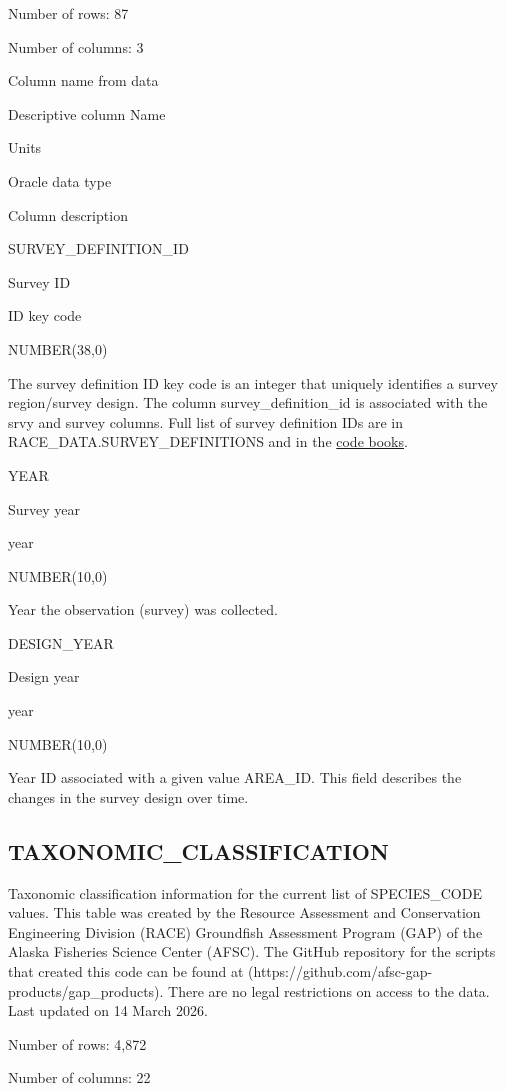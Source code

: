 \documentclass[
  letterpaper,
  oneside,
  open=any]{scrbook}
\begin{document}
Number of rows: 87

Number of columns: 3

Column name from data

Descriptive column Name

Units

Oracle data type

Column description

SURVEY\_DEFINITION\_ID

Survey ID

ID key code

NUMBER(38,0)

The survey definition ID key code is an integer that uniquely identifies
a survey region/survey design. The column survey\_definition\_id is
associated with the srvy and survey columns. Full list of survey
definition IDs are in RACE\_DATA.SURVEY\_DEFINITIONS and in the
\href{https://www.fisheries.noaa.gov/resource/document/groundfish-survey-species-code-manual-and-data-codes-manual}{code
books}.

YEAR

Survey year

year

NUMBER(10,0)

Year the observation (survey) was collected.

DESIGN\_YEAR

Design year

year

NUMBER(10,0)

Year ID associated with a given value AREA\_ID. This field describes the
changes in the survey design over time.

\subsection{TAXONOMIC\_CLASSIFICATION}\label{taxonomic_classification}

Taxonomic classification information for the current list of
SPECIES\_CODE values. This table was created by the Resource Assessment
and Conservation Engineering Division (RACE) Groundfish Assessment
Program (GAP) of the Alaska Fisheries Science Center (AFSC). The GitHub
repository for the scripts that created this code can be found at
(https://github.com/afsc-gap-products/gap\_products). There are no legal
restrictions on access to the data. Last updated on 14 March 2026.

Number of rows: 4,872

Number of columns: 22
\end{document}
